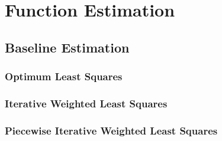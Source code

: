 \documentclass[a4paper,11pt]{article}
\begin{document}
\section{Function Estimation}
\label{sec-4}
\subsection{Baseline Estimation}
\label{sec-4-1}
\subsubsection{Optimum Least Squares}
\label{sec-4-1-1}
\subsubsection{Iterative Weighted Least Squares}
\label{sec-4-1-2}
\subsubsection{Piecewise Iterative Weighted Least Squares}
\label{sec-4-1-3}
\end{document}
